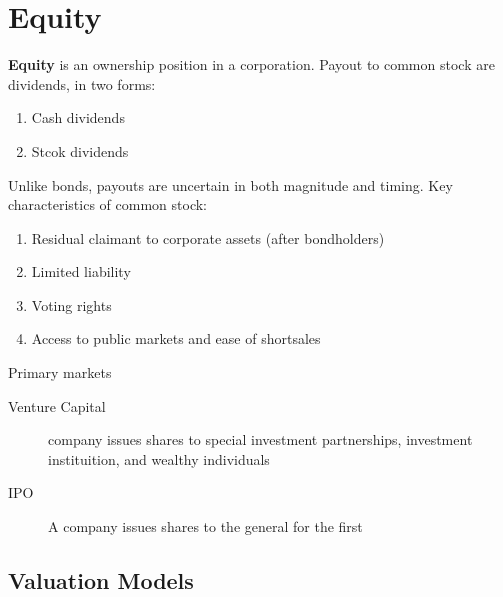 \chapter{Equity}
\textbf{Equity} is an ownership position in a corporation. Payout to common stock are dividends, in two forms:
\begin{enumerate}
    \item Cash dividends
    \item Stcok dividends
\end{enumerate}
Unlike bonds, payouts are uncertain in both magnitude and timing. Key characteristics of common stock:
\begin{enumerate}
    \item Residual claimant to corporate assets (after bondholders)
    \item Limited liability
    \item Voting rights
    \item Access to public markets and ease of shortsales
\end{enumerate}
Primary markets
\begin{description}
    \item[Venture Capital] company issues shares to special investment partnerships, investment instituition, and wealthy individuals
    \item[IPO] A company issues shares to the general for the first  
\end{description}

\section{Valuation Models}

